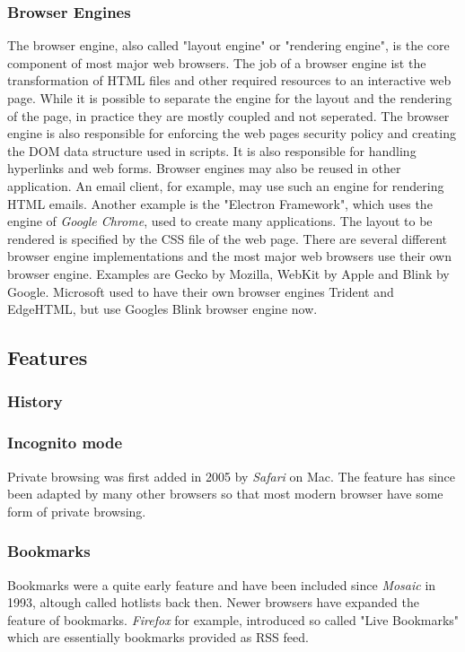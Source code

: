 \documentclass[runningheads]{llncs}
\begin{document}
			\subsubsection{Browser Engines}
			\leavevmode\newline
			The browser engine, also called "layout engine" or "rendering engine", is the core component of most major web browsers. The job of a browser engine ist the transformation of HTML files and other required resources to an interactive web page. While it is possible to separate the engine for the layout and the rendering of the page, in practice they are mostly coupled and not seperated. The browser engine is also responsible for enforcing the web pages security policy and creating the DOM data structure used in scripts. It is also responsible for handling hyperlinks and web forms.
			Browser engines may also be reused in other application. An email client, for example, may use such an engine for rendering HTML emails. Another example is the "Electron Framework", which uses the engine of \textit{Google Chrome}, used to create many applications. The layout to be rendered is specified by the CSS file of the web page. There are several different browser engine implementations and the most major web browsers use their own browser engine. Examples are Gecko by Mozilla, WebKit by Apple and Blink by Google. Microsoft used to have their own browser engines Trident and EdgeHTML, but use Googles Blink browser engine now.
		\subsection{Features}
			\subsubsection{History}
			\subsubsection{Incognito mode}
			Private browsing was first added in 2005 by \textit{Safari} on Mac. The feature has since been adapted by many other browsers so that most modern browser have some form of private browsing.
			\subsubsection{Bookmarks}
			Bookmarks were a quite early feature and have been included since \textit{Mosaic} in 1993, altough called hotlists back then. Newer browsers have expanded the feature of bookmarks. \textit{Firefox} for example, introduced so called "Live Bookmarks" which are essentially bookmarks provided as RSS feed.
\end{document}
